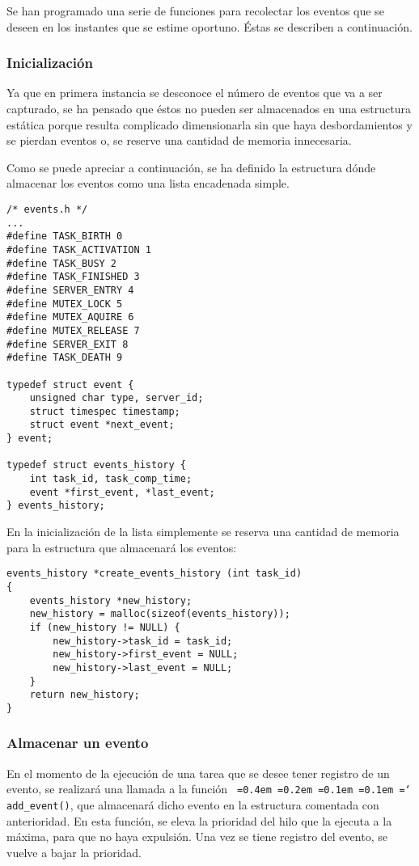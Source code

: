 \documentclass[11pt,spanish]{article}
\newcommand*\justify{%
  \fontdimen2\font=0.4em%
  \fontdimen3\font=0.2em%
  \fontdimen4\font=0.1em%
  \fontdimen7\font=0.1em%
  \hyphenchar\font=`\-%
}
\newcommand{\code}[1]{\texttt{\justify #1}}
\begin{document}
Se han programado una serie de funciones para recolectar los eventos que se deseen
en los instantes que se estime oportuno. Éstas se describen a continuación.

\subsubsection{Inicialización}
Ya que en primera instancia se desconoce el número de eventos que va a ser capturado,
se ha pensado que éstos no pueden ser almacenados en una estructura estática porque
resulta complicado dimensionarla sin que haya desbordamientos y se pierdan eventos o, se 
reserve una cantidad de memoria innecesaria.

Como se puede apreciar a continuación, se ha definido la estructura dónde almacenar los 
eventos como una lista encadenada simple.

\begin{lstlisting}[style=c]
/* events.h */
...
#define TASK_BIRTH 0
#define TASK_ACTIVATION 1
#define TASK_BUSY 2
#define TASK_FINISHED 3
#define SERVER_ENTRY 4
#define MUTEX_LOCK 5
#define MUTEX_AQUIRE 6
#define MUTEX_RELEASE 7
#define SERVER_EXIT 8
#define TASK_DEATH 9

typedef struct event {
    unsigned char type, server_id; 
    struct timespec timestamp;
    struct event *next_event;
} event;

typedef struct events_history {
	int task_id, task_comp_time;
	event *first_event, *last_event;
} events_history;
\end{lstlisting}

En la inicialización de la lista simplemente se reserva una cantidad de memoria para la estructura 
que almacenará los eventos:

\begin{lstlisting}[style=c]
events_history *create_events_history (int task_id)
{
	events_history *new_history;
	new_history = malloc(sizeof(events_history));
	if (new_history != NULL) {
		new_history->task_id = task_id;
		new_history->first_event = NULL;
		new_history->last_event = NULL;
	}
	return new_history;
}
\end{lstlisting}

\subsubsection{Almacenar un evento}
En el momento de la ejecución de una tarea que se desee tener registro de un evento,
se realizará una llamada a la función \code{add\_event()}, que almacenará dicho evento
en la estructura comentada con anterioridad. En esta función, se eleva la prioridad
del hilo que la ejecuta a la máxima, para que no haya expulsión. Una vez se tiene registro
del evento, se vuelve a bajar la prioridad.
\end{document}
